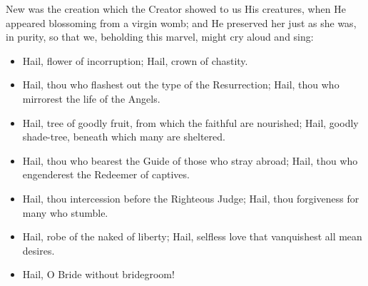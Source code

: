 \documentclass[twoside, letterpaper, 12pt]{report}
\begin{document}






\begin{priest}
  \item New was the creation which the Creator showed to us His creatures,
  when He appeared blossoming from a virgin womb;
  and He preserved her just as she was, in purity,
  so that we, beholding this marvel, might cry aloud and sing:
\end{priest}

\begin{itemize}[label=\tiny{+},leftmargin=*]
\item Hail, flower of incorruption;
      Hail, crown of chastity.
\item Hail, thou who flashest out the type of the Resurrection;
      Hail, thou who mirrorest the life of the Angels.
\item Hail, tree of goodly fruit, from which the faithful are nourished;
      Hail, goodly shade-tree, beneath which many are sheltered.
\item Hail, thou who bearest the Guide of those who stray abroad;
      Hail, thou who engenderest the Redeemer of captives.
\item Hail, thou intercession before the Righteous Judge;
      Hail, thou forgiveness for many who stumble.
\item Hail, robe of the naked of liberty;
      Hail, selfless love that vanquishest all mean desires.
\item Hail, O Bride without bridegroom! 
\end{itemize}
\end{document}
